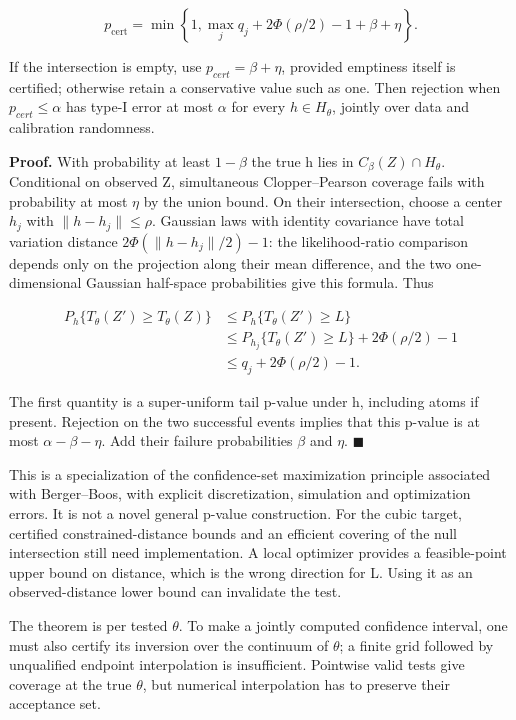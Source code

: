 \documentclass[
  11pt,
]{article}
\begin{document}
\[
 p_{\mathrm{cert}}=
 \min\left\{1,\max_jq_j+
             2\Phi(\rho/2)-1+\beta+\eta\right\}. \tag{M1}
\]

If the intersection is empty, use \(p_{cert}=\beta +\eta\), provided
emptiness itself is certified; otherwise retain a conservative value
such as one. Then rejection when \(p_{cert}\le \alpha\) has type-I error
at most \(\alpha\) for every \(h\in H_\theta\), jointly over data and
calibration randomness.

\textbf{Proof.} With probability at least \(1-\beta\) the true h lies in
\(C_\beta (Z)∩H_\theta\). Conditional on observed Z, simultaneous
Clopper--Pearson coverage fails with probability at most \(\eta\) by the
union bound. On their intersection, choose a center \(h_j\) with
\(\|h-h_j\|\le \rho\). Gaussian laws with identity covariance have total
variation distance \(2\Phi (\|h-h_j\|/2)-1\): the likelihood-ratio
comparison depends only on the projection along their mean difference,
and the two one-dimensional Gaussian half-space probabilities give this
formula. Thus

\[
 \begin{aligned}
 P_h\{T_\theta(Z')\ge T_\theta(Z)\}
 &\le P_h\{T_\theta(Z')\ge L\}\\
 &\le P_{h_j}\{T_\theta(Z')\ge L\}+2\Phi(\rho/2)-1\\
 &\le q_j+2\Phi(\rho/2)-1.
 \end{aligned}
\]

The first quantity is a super-uniform tail p-value under h, including
atoms if present. Rejection on the two successful events implies that
this p-value is at most \(\alpha -\beta -\eta\). Add their failure
probabilities \(\beta\) and \(\eta\). \(\blacksquare\)

This is a specialization of the confidence-set maximization principle
associated with Berger--Boos, with explicit discretization, simulation
and optimization errors. It is not a novel general p-value construction.
For the cubic target, certified constrained-distance bounds and an
efficient covering of the null intersection still need implementation. A
local optimizer provides a feasible-point upper bound on distance, which
is the wrong direction for L. Using it as an observed-distance lower
bound can invalidate the test.

The theorem is per tested \(\theta\). To make a jointly computed
confidence interval, one must also certify its inversion over the
continuum of \(\theta\); a finite grid followed by unqualified endpoint
interpolation is insufficient. Pointwise valid tests give coverage at
the true \(\theta\), but numerical interpolation has to preserve their
acceptance set.
\end{document}

